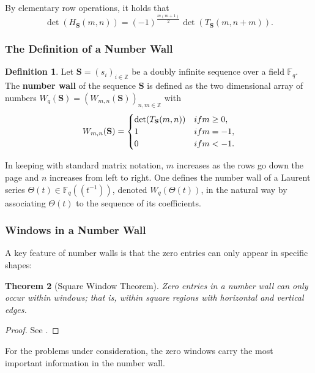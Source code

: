 \documentclass{article}
\newtheorem{theorem}{Theorem}[subsection]
\theoremstyle{definition}
\newtheorem{definition}[theorem]{Definition}
\newcommand{\F}{\mathbb{F}}
\numberwithin{equation}{subsection}
\begin{document}
\noindent By elementary row operations, it holds that \begin{equation}
    \det(H_{\mathbf{S}}(m,n))=(-1)^{\frac{m(m+1)}{2}} \det(T_{\mathbf{S}}(m,n+m)).\label{hanktoe}
\end{equation}
\subsubsection*{The Definition of a Number Wall}
\begin{definition}\label{nw}
Let $\mathbf{S}=(s_i)_{i\in\mathbb{Z}}$ be a doubly infinite sequence over a field $\F_q$. The \textbf{number wall} of the sequence $\mathbf{S}$ is defined as the two dimensional array of numbers $W_q(\mathbf{S})=(W_{m,n}(\mathbf{S}))_{n,m\in\mathbb{Z}}$ with \begin{equation*}
    W_{m,n}(\mathbf{S})=\begin{cases}\det(T_{\mathbf{S}}(m,n)) &\textup{ if } m\ge0,\\
    1 & \textup{ if } m=-1,\\
    0 & \textup{ if } m<-1. \end{cases}
\end{equation*}  
\end{definition} 
\noindent In keeping with standard matrix notation, $m$ increases as the rows go down the page and $n$ increases from left to right. One defines the number wall of a Laurent series $\Theta(t)\in \F_q\!\left(\!\left(t^{-1}\right)\!\right)$, denoted $W_q(\Theta(t))$, in the natural way by associating $\Theta(t)$ to the sequence of its coefficients.\\
\subsubsection*{Windows in a Number Wall}
\noindent A key feature of number walls is that the zero entries can only appear in specific shapes:
\begin{theorem}[Square Window Theorem]\label{window}
Zero entries in a number wall can only occur within windows; that is, within
square regions with horizontal and vertical edges.
\end{theorem}
\begin{proof}
See \cite[page 9]{numbwall}.
\end{proof}

\noindent For the problems under consideration, the zero windows carry the most important information in the number wall. 
\end{document}
